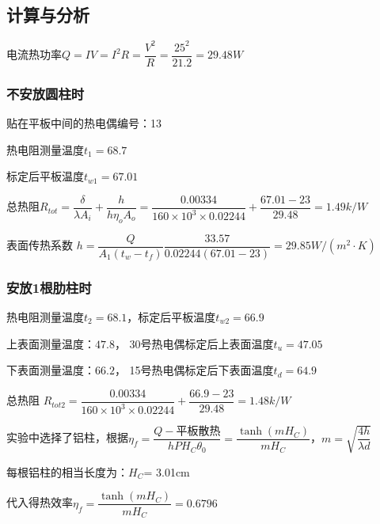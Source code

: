 \documentclass[UTF8,a4paper,10pt]{ctexart}
\begin{document}
	\subsection{计算与分析}
	电流热功率$Q=IV=I^{2}R=\dfrac{V^{2}}{R}=\dfrac{25^{2}}{21.2}=29.48W$
	\subsubsection{不安放圆柱时}
	贴在平板中间的热电偶编号：13
	
	热电阻测量温度$t_{1} = 68.7$\textcelsius
	
	标定后平板温度$t_{w1} = 67.01$\textcelsius
	
	总热阻$R_{tot} = \dfrac{\delta}{\lambda A_{i}}+\dfrac{h}{h\eta_{o}A_{o}}=\dfrac{0.00334}{160\times10^{3}\times0.02244}+\dfrac{67.01-23}{29.48}=1.49k/W$
	
	表面传热系数 $h=\dfrac{Q}{A_{1}(t_{w}−t_{f})}
	\dfrac{33.57}{0.02244(67.01-23)}=29.85W/(m^{2}\cdot K)$
	
	\subsubsection{安放1根肋柱时}
	
	热电阻测量温度$t_{2} = 68.1$\textcelsius，标定后平板温度$t_{w2} = 66.9$\textcelsius
	
	上表面测量温度：$47.8$\textcelsius， 30号热电偶标定后上表面温度$t_{u}=47.05$\textcelsius
	
	下表面测量温度：$66.2$\textcelsius， 15号热电偶标定后下表面温度$t_{d}=64.9$\textcelsius
	
	总热阻 $R_{tot2}=\dfrac{0.00334}{160\times10^{3}\times0.02244}+\dfrac{66.9-23}{29.48}=1.48k/W$
	
	实验中选择了铝柱，根据$ \eta_{f} = \dfrac{Q-\text{平板散热}}{hPH_{C}\theta_{0}}= \dfrac{\tanh(mH_{C})}{mH_{C}}$，$m=\sqrt{\dfrac{4h}{\lambda d}}$
	
	每根铝柱的相当长度为：$ H_{C} $= 3.01cm
	
	代入得热效率$\eta_{f} = \dfrac{\tanh(mH_{C})}{mH_{C}} =0.6796$
	
\end{document}
